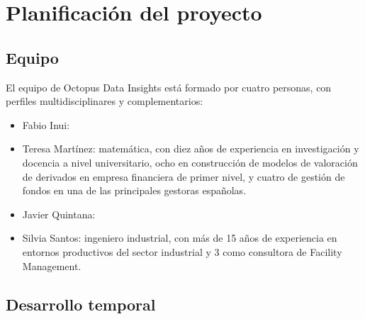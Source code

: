 \chapter{Planificación del proyecto}
\section{Equipo}
El equipo de Octopus Data Insights está formado por cuatro personas, con perfiles multidisciplinares y complementarios:
\begin{itemize}
\item Fabio Inui: 
\item Teresa Martínez: matemática, con diez años de experiencia en investigación y docencia a nivel universitario,
ocho en construcción de modelos de valoración de derivados en empresa financiera de primer nivel, y cuatro de
gestión de fondos en una de las principales gestoras españolas.
\item Javier Quintana: 
\item Silvia Santos: ingeniero industrial, con más de 15 años de experiencia en entornos productivos del sector industrial y 3 como consultora de Facility Management.
\end{itemize}

\section{Desarrollo temporal}

